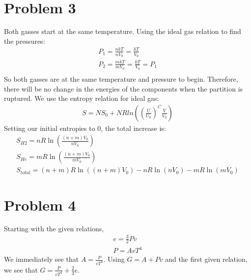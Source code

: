 \documentclass[a4paper,10pt]{article}
\numberwithin{equation}{section}
\begin{document}
\section{Problem 3}
Both gasses start at the same temperature. Using the ideal gas relation to find the pressures:
\begin{gather}
 P_1=\frac{nkT}{nV_0}=\frac{kT}{V_0}\\
 P_2=\frac{mkT}{mV_0}=\frac{kT}{V_0}=P_1\\
\end{gather}
So both gasses are at the same temperature and pressure to begin.
Therefore, there will be no change in the energies of the components when the partition is ruptured.
We use the entropy relation for ideal gas:
\begin{gather}
 S=NS_0+NRln\left (\left(\frac{U}{U_0}\right )^C\frac{V}{V_0}\right )
\end{gather}
Setting our initial entropies to 0, the total increase is:
\begin{gather}
 S_{H2}=nR\ln{\left(\frac{(n+m)V_0}{nV_0} \right)}\\
 S_{He}=mR\ln{\left(\frac{(n+m)V_0}{mV_0} \right)}\\
 S_{total} = (n+m)R\ln{\left((n+m)V_0\right )}-nR\ln{(nV_0)}-mR\ln{(mV_0)}
\end{gather}


\section{Problem 4}
Starting with the given relations,
\begin{gather}
 e = \frac{3}{2}Pv\\
 P = AvT^4
\end{gather}
We immediately see that $A = \frac{P}{vT^4}$.
Using $G=A+Pv$ and the first given relation, we see that $G=\frac{P}{vT^4}+\frac{2}{3}e$.
\end{document}

